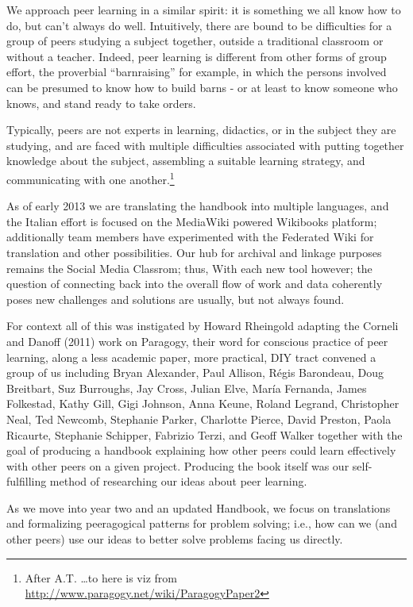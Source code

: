 \documentclass{acm_proc_article-sp}
\begin{document}
We approach peer learning in a similar spirit: it is something we all know how to do, but can't always do well. Intuitively, there are bound to be difficulties for a group of peers studying a subject together, outside a traditional classroom or without a teacher. Indeed, peer learning is different from other forms of group effort, the proverbial ``barnraising'' for example, in which the persons involved can be presumed to know how to build barns - or at least to know someone who knows, and stand ready to take orders.

Typically, peers are not experts in learning, didactics, or in the subject they are studying, and are faced with multiple difficulties associated with putting together knowledge about the subject, assembling a suitable learning strategy, and communicating with one another.\footnote{After A.T. \ldots to here is viz from \url{http://www.paragogy.net/wiki/ParagogyPaper2}}

As of early 2013 we are translating the handbook into multiple languages, and the Italian effort is focused on the MediaWiki powered Wikibooks platform; additionally team members have experimented with the Federated Wiki for translation and other possibilities. Our hub for archival and linkage purposes remains the Social Media Classrom; thus, With each new tool however; the question of connecting back into the overall flow of work and data coherently poses new challenges and solutions are usually, but not always found.

For context all of this was instigated by Howard Rheingold adapting the Corneli and Danoff (2011) work on Paragogy, their word for conscious practice of peer learning, along a less academic paper, more practical, DIY tract convened a group of us including Bryan Alexander, Paul Allison, R\'egis Barondeau, Doug Breitbart, Suz Burroughs, Jay Cross, Julian Elve, Mar\'ia Fernanda, James Folkestad, Kathy Gill, Gigi Johnson, Anna Keune, Roland Legrand, Christopher Neal, Ted Newcomb, Stephanie Parker, Charlotte Pierce, David Preston, Paola Ricaurte, Stephanie Schipper, Fabrizio Terzi, and Geoff Walker together with the goal of producing a handbook explaining how other peers could learn effectively with other peers on a given project. Producing the book itself was our self-fulfilling method of researching our ideas about peer learning.

As we move into year two and an updated Handbook, we focus on translations and formalizing peeragogical patterns for problem solving; i.e., how can we (and other peers) use our ideas to better solve problems facing us directly.
\end{document}
